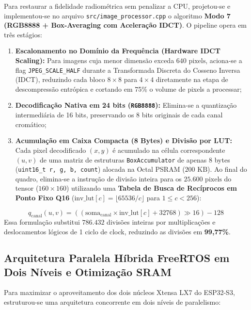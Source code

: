 \documentclass[12pt]{article}
\begin{document}
Para restaurar a fidelidade radiométrica sem penalizar a CPU, projetou-se e implementou-se no arquivo \texttt{src/image\_processor.cpp} o algoritmo \textbf{Modo 7 (RGB8888 + Box-Averaging com Aceleração IDCT)}. O pipeline opera em três estágios:
\begin{enumerate}
    \item \textbf{Escalonamento no Domínio da Frequência (Hardware IDCT Scaling):} Para imagens cuja menor dimensão exceda $640\text{ pixels}$, aciona-se a flag \texttt{JPEG\_SCALE\_HALF} durante a Transformada Discreta do Cosseno Inversa (IDCT), reduzindo cada bloco $8 \times 8$ para $4 \times 4$ diretamente na etapa de descompressão entrópica e cortando em 75\% o volume de pixels a processar;
    \item \textbf{Decodificação Nativa em 24 bits (\texttt{RGB8888}):} Elimina-se a quantização intermediária de 16 bits, preservando os 8 bits originais de cada canal cromático;
    \item \textbf{Acumulação em Caixa Compacta (8 Bytes) e Divisão por LUT:} Cada pixel decodificado $(x,y)$ é acumulado na célula correspondente $(u,v)$ de uma matriz de estruturas \texttt{BoxAccumulator} de apenas 8 bytes (\texttt{uint16\_t r, g, b, count}) alocada na Octal PSRAM ($200\text{ KB}$). Ao final do quadro, elimina-se a instrução de divisão inteira para os $25.600\text{ pixels}$ do tensor ($160 \times 160$) utilizando uma \textbf{Tabela de Busca de Recíprocos em Ponto Fixo Q16} ($\text{inv\_lut}[c] = \lfloor 65536 / c \rfloor$ para $1 \le c < 256$):
\end{enumerate}
\begin{equation}
q_{\text{canal}}(u,v) = \left( \left( \text{soma}_{\text{canal}} \times \text{inv\_lut}[c] + 32768 \right) \gg 16 \right) - 128
\label{eq:lut_q16}
\end{equation}
Essa formulação substitui $786.432$ divisões inteiras por multiplicações e deslocamentos lógicos de 1 ciclo de clock, reduzindo as divisões em \textbf{99,77\%}.

\subsection{Arquitetura Paralela Híbrida FreeRTOS em Dois Níveis e Otimização SRAM}

Para maximizar o aproveitamento dos dois núcleos Xtensa LX7 do ESP32-S3, estruturou-se uma arquitetura concorrente em dois níveis de paralelismo:
\end{document}
